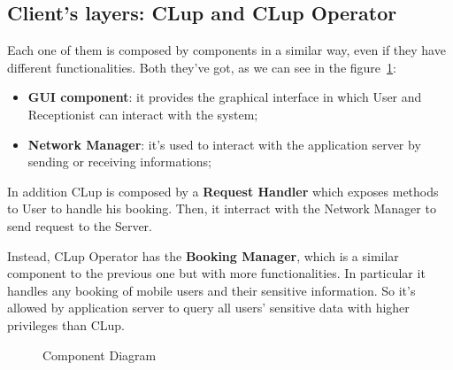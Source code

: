 \subsection{Client's layers: CLup and CLup Operator}
Each one of them is composed by components in a similar way, even if they have different functionalities.
Both they've got, as we can see in the figure~\ref{component_diagram}:
\begin{itemize} 
\item \textbf{GUI component}: it provides the graphical interface in which User and Receptionist can interact with the system;
\item \textbf{Network Manager}: it's used to interact with the application server by sending or receiving informations; 
\end{itemize}


In addition CLup is composed by a \textbf{Request Handler} which exposes methods to User to handle his booking. Then, it interract with the Network Manager to send request to the Server. 

Instead, CLup Operator has the \textbf{Booking Manager}, which is a similar component to the previous one but with more functionalities. In particular it handles any booking of mobile users and their sensitive information. So it's allowed by application server to query all users' sensitive data with higher privileges than CLup.




\begin{figure}[h]
  \label{component_diagram}
  \centering
    \caption{Component Diagram}
\end{figure}




